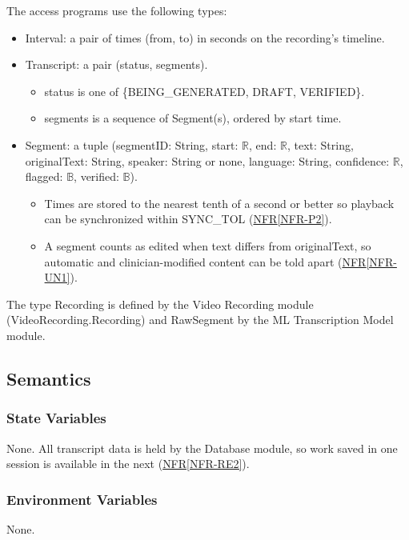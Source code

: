 \documentclass[12pt, titlepage]{article}
\newcommand{\srsref}[2]{\href{https://github.com/Nour-Fawaz/MacaBoca/blob/main/pdfs/SRS/SRS.pdf}{#1\ref*{#2}}}
\begin{document}
\noindent The access programs use the following types:
\begin{itemize}
\item Interval: a pair of times (from, to) in seconds on the recording's timeline.
\item Transcript: a pair (status, segments).
  \begin{itemize}
  \item status is one of \{BEING\_GENERATED, DRAFT, VERIFIED\}.
  \item segments is a sequence of Segment(s), ordered by start time.
  \end{itemize}
\item Segment: a tuple (segmentID: String, start: $\mathbb{R}$, end: $\mathbb{R}$, text: String, originalText: String, speaker: String or none, language: String, confidence: $\mathbb{R}$, flagged: $\mathbb{B}$, verified: $\mathbb{B}$).
  \begin{itemize}
  \item Times are stored to the nearest tenth of a second or better so playback can be synchronized within SYNC\_TOL (\srsref{NFR}{NFR-P2}).
  \item A segment counts as edited when text differs from originalText, so automatic and clinician-modified content can be told apart (\srsref{NFR}{NFR-UN1}).
  \end{itemize}
\end{itemize}
The type Recording is defined by the Video Recording module (VideoRecording.Recording) and RawSegment by the ML Transcription Model module.

\subsection{Semantics}

\subsubsection{State Variables}
None. All transcript data is held by the Database module, so work saved in one session is available in the next (\srsref{NFR}{NFR-RE2}).

\subsubsection{Environment Variables}
None.
\end{document}
